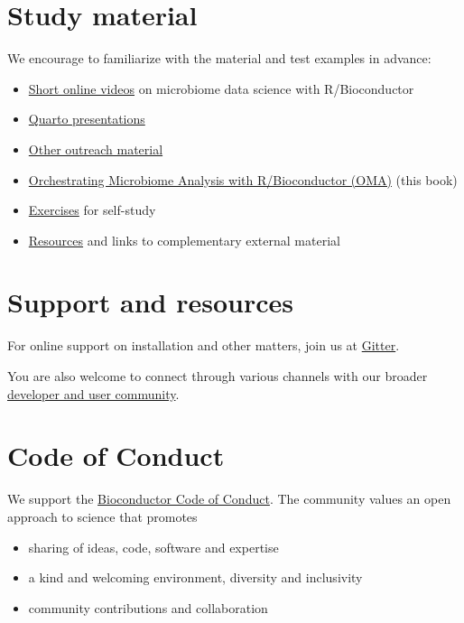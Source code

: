 \documentclass[
]{book}
\providecommand{\tightlist}{%
  \setlength{\itemsep}{0pt}\setlength{\parskip}{0pt}}
\begin{document}
\hypertarget{material}{%
\section{Study material}\label{material}}

We encourage to familiarize with the material and test examples in advance:

\begin{itemize}
\item
  \href{https://www.youtube.com/playlist?list=PLjiXAZO27elAJEptP59BN3whVJ61XIkST}{Short online videos} on microbiome data science with R/Bioconductor
\item
  \href{https://microbiome.github.io/outreach/index.html}{Quarto presentations}
\item
  \href{https://github.com/microbiome/outreach}{Other outreach material}
\item
  \href{https://microbiome.github.io/OMA/}{Orchestrating Microbiome Analysis with R/Bioconductor (OMA)} (this book)
\item
  \protect\hyperlink{exercises}{Exercises} for self-study
\item
  \protect\hyperlink{resources}{Resources} and links to complementary external material
\end{itemize}

\hypertarget{support-and-resources}{%
\section{Support and resources}\label{support-and-resources}}

For online support on installation and other matters, join us at
\href{https://gitter.im/microbiome/miaverse?utm_source=badge\&utm_medium=badge\&utm_campaign=pr-badge\&utm_content=badge}{Gitter}.

You are also welcome to connect through various channels with our
broader \href{https://microbiome.github.io}{developer and user community}.

\hypertarget{coc}{%
\section{Code of Conduct}\label{coc}}

We support the \href{https://bioconductor.github.io/bioc_coc_multilingual/}{Bioconductor Code of Conduct}. The community values an open approach to science that promotes

\begin{itemize}
\tightlist
\item
  sharing of ideas, code, software and expertise
\item
  a kind and welcoming environment, diversity and inclusivity
\item
  community contributions and collaboration
\end{itemize}
\end{document}
